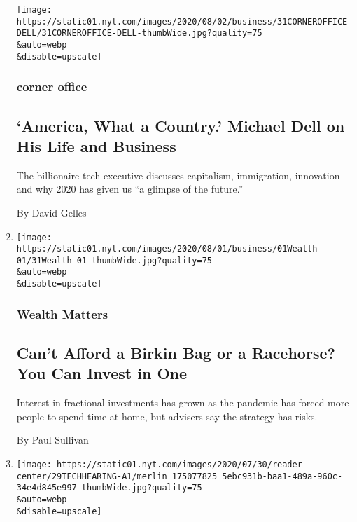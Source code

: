 \begin{enumerate}
  \texttt{[image: https://static01.nyt.com/images/2020/08/02/business/31CORNEROFFICE-DELL/31CORNEROFFICE-DELL-thumbWide.jpg?quality=75\\\&auto=webp\\\&disable=upscale]}

  \hypertarget{corner-office}{%
  \subsubsection{corner office}\label{corner-office}}

  \hypertarget{america-what-a-country-michael-dell-on-his-life-and-business}{%
  \subsection{`America, What a Country.' Michael Dell on His Life and
  Business}\label{america-what-a-country-michael-dell-on-his-life-and-business}}

  The billionaire tech executive discusses capitalism, immigration,
  innovation and why 2020 has given us ``a glimpse of the future.''

  By David Gelles
\item
  \href{/2020/07/31/your-money/birkin-bag-racehorse-invest.html}{}

  \texttt{[image: https://static01.nyt.com/images/2020/08/01/business/01Wealth-01/31Wealth-01-thumbWide.jpg?quality=75\\\&auto=webp\\\&disable=upscale]}

  \hypertarget{wealth-matters}{%
  \subsubsection{Wealth Matters}\label{wealth-matters}}

  \hypertarget{cant-afford-a-birkin-bag-or-a-racehorse-you-can-invest-in-one}{%
  \subsection{Can't Afford a Birkin Bag or a Racehorse? You Can Invest
  in
  One}\label{cant-afford-a-birkin-bag-or-a-racehorse-you-can-invest-in-one}}

  Interest in fractional investments has grown as the pandemic has
  forced more people to spend time at home, but advisers say the
  strategy has risks.

  By Paul Sullivan
\item
  \href{/2020/07/29/technology/big-tech-hearing-apple-amazon-facebook-google.html}{}

  \texttt{[image: https://static01.nyt.com/images/2020/07/30/reader-center/29TECHHEARING-A1/merlin\_175077825\_5ebc931b-baa1-489a-960c-34e4d845e997-thumbWide.jpg?quality=75\\\&auto=webp\\\&disable=upscale]}


\end{enumerate}
